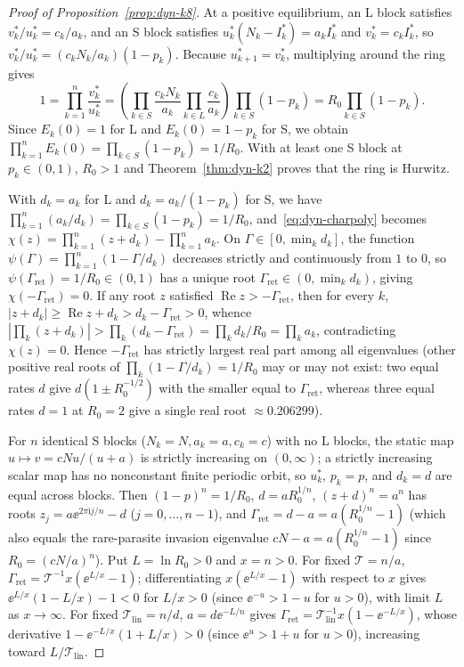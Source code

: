 \begin{proof}[Proof of Proposition~{\upshape\ref{prop:dyn-k8}}]
At a positive equilibrium, an L block satisfies $v_k^*/u_k^* = c_k/a_k$, and an S block satisfies $u_k^*(N_k - I_k^*) = a_k I_k^*$ and $v_k^* = c_k I_k^*$, so $v_k^*/u_k^* = (c_k N_k/a_k)(1 - p_k)$. Because $u_{k+1}^* = v_k^*$, multiplying around the ring gives
\[
1 = \prod_{k=1}^n \frac{v_k^*}{u_k^*} = \left(\prod_{k \in S} \frac{c_k N_k}{a_k} \prod_{k \in L} \frac{c_k}{a_k}\right) \prod_{k \in S}(1 - p_k) = R_0 \prod_{k \in S}(1 - p_k).
\]
Since $E_k(0) = 1$ for L and $E_k(0) = 1 - p_k$ for S, we obtain $\prod_{k=1}^n E_k(0) = \prod_{k \in S}(1 - p_k) = 1/R_0$. With at least one S block at $p_k \in (0, 1)$, $R_0 > 1$ and Theorem~\ref{thm:dyn-k2} proves that the ring is Hurwitz.

With $d_k = a_k$ for L and $d_k = a_k/(1 - p_k)$ for S, we have $\prod_{k=1}^n (a_k/d_k) = \prod_{k \in S}(1 - p_k) = 1/R_0$, and~\eqref{eq:dyn-charpoly} becomes $\chi(z) = \prod_{k=1}^n (z + d_k) - \prod_{k=1}^n a_k$. On $\Gamma \in [0, \min_k d_k]$, the function $\psi(\Gamma) = \prod_{k=1}^n (1 - \Gamma/d_k)$ decreases strictly and continuously from $1$ to $0$, so $\psi(\Gamma_{\mathrm{ret}}) = 1/R_0 \in (0, 1)$ has a unique root $\Gamma_{\mathrm{ret}} \in (0, \min_k d_k)$, giving $\chi(-\Gamma_{\mathrm{ret}}) = 0$. If any root $z$ satisfied $\operatorname{Re} z > -\Gamma_{\mathrm{ret}}$, then for every $k$, $|z + d_k| \ge \operatorname{Re} z + d_k > d_k - \Gamma_{\mathrm{ret}} > 0$, whence $|\prod_k (z + d_k)| > \prod_k (d_k - \Gamma_{\mathrm{ret}}) = \prod_k d_k / R_0 = \prod_k a_k$, contradicting $\chi(z) = 0$. Hence $-\Gamma_{\mathrm{ret}}$ has strictly largest real part among all eigenvalues (other positive real roots of $\prod_k(1 - \Gamma/d_k) = 1/R_0$ may or may not exist: two equal rates $d$ give $d(1 \pm R_0^{-1/2})$ with the smaller equal to $\Gamma_{\mathrm{ret}}$, whereas three equal rates $d = 1$ at $R_0 = 2$ give a single real root $\approx 0.206299$).

For $n$ identical S blocks ($N_k = N, a_k = a, c_k = c$) with no L blocks, the static map $u \mapsto v = cNu/(u + a)$ is strictly increasing on $(0, \infty)$; a strictly increasing scalar map has no nonconstant finite periodic orbit, so $u_k^*$, $p_k = p$, and $d_k = d$ are equal across blocks. Then $(1 - p)^n = 1/R_0$, $d = a R_0^{1/n}$, $(z + d)^n = a^n$ has roots $z_j = a\ee^{2\pi\mathrm{i}j/n} - d$ ($j = 0, \dots, n - 1$), and $\Gamma_{\mathrm{ret}} = d - a = a(R_0^{1/n} - 1)$ (which also equals the rare-parasite invasion eigenvalue $cN - a = a(R_0^{1/n} - 1)$ since $R_0 = (cN/a)^n$). Put $L = \ln R_0 > 0$ and $x = n > 0$. For fixed $\mathcal{T} = n/a$, $\Gamma_{\mathrm{ret}} = \mathcal{T}^{-1} x(\ee^{L/x} - 1)$; differentiating $x(\ee^{L/x} - 1)$ with respect to $x$ gives $\ee^{L/x}(1 - L/x) - 1 < 0$ for $L/x > 0$ (since $\ee^{-u} > 1 - u$ for $u > 0$), with limit $L$ as $x \to \infty$. For fixed $\mathcal{T}_{\mathrm{lin}} = n/d$, $a = d\ee^{-L/n}$ gives $\Gamma_{\mathrm{ret}} = \mathcal{T}_{\mathrm{lin}}^{-1} x(1 - \ee^{-L/x})$, whose derivative $1 - \ee^{-L/x}(1 + L/x) > 0$ (since $\ee^u > 1 + u$ for $u > 0$), increasing toward $L/\mathcal{T}_{\mathrm{lin}}$.
\end{proof}

